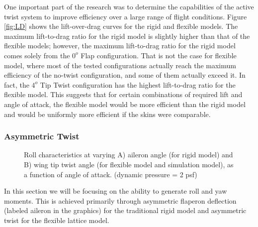 \documentclass[11pt]{ucthesis}
\begin{document}
One important part of the research was to determine the capabilities of the active twist system to improve efficiency over a large range of flight conditions. Figure \ref{fig:LD} shows the lift-over-drag curves for the rigid and flexible models. The maximum lift-to-drag ratio for the rigid model is slightly higher than that of the flexible models; however, the maximum lift-to-drag ratio for the rigid model comes solely from the $0^o$ Flap configuration. That is not the case for flexible model, where most of the tested configurations actually reach the maximum efficiency of the no-twist configuration, and some of them actually exceed it. In fact, the $4^o$ Tip Twist configuration has the highest lift-to-drag ratio for the flexible model. This suggests that for certain combinations of required lift and angle of attack, the flexible model would be more efficient than the rigid model and would be uniformly more efficient if the skins were comparable.

\subsubsection{Asymmetric Twist}
\begin{figure}
\hfill
{}
\hfill
{}
\hfill
\caption{Roll characteristics at varying A) aileron angle (for rigid model) and B) wing tip twist angle (for flexible model and simulation model), as a function of angle of attack. (dynamic pressure = 2 psf)}
\label{fig:Q2Roll}
\end{figure}

In this section we will be focusing on the ability to generate roll and yaw moments. This is achieved primarily through asymmetric flaperon deflection (labeled aileron in the graphics) for the traditional rigid model and asymmetric twist for the flexible lattice model.
\end{document}
